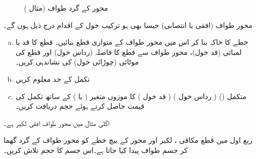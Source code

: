 \begin{figure}
\begin{subfigure}{0.45\textwidth}
\caption{}
\end{subfigure}
\caption{محور  کے گرد طواف (مثال )}
\label{شکل_مثال_تکمل_استعمال_پہلے_بھی-حل}
\end{figure}

محور طواف (افقی یا انتصابی) جیسا بھی ہو ترکیب خول کے اقدام درج ذیل ہوں گے۔
\begin{enumerate}[a.]
\item
خطے کا خاکہ بنا کر اس میں محور طواف کے متوازی قطع بنائیں۔ قطع کا قد یا لمبائی (قد خول)،  محور طواف سے قطع کا فاصلہ (رداس خول) اور قطع کی موٹائی (چوڑائی خول) کی نشاندہی کریں۔
\item
تکمل کے حد معلوم کریں
\item
متکمل () ( رداس خول ) ( قد خول )  کا موزوں متغیر ( یا ) کے ساتھ تکمل کی قیمت حاصل کرتے ہوئے حجم دریافت کریں۔
\end{enumerate} 

اگلی مثال میں محور طواف افقی لکیر  ہے۔

ربع اول میں قطع مکافی ، لکیر  اور  محور کے بیچ خطے کو محور طواف  کے گرد گھما کر جسم طواف پیدا کیا جاتا ہے۔اس جسم کا حجم تلاش کریں۔

